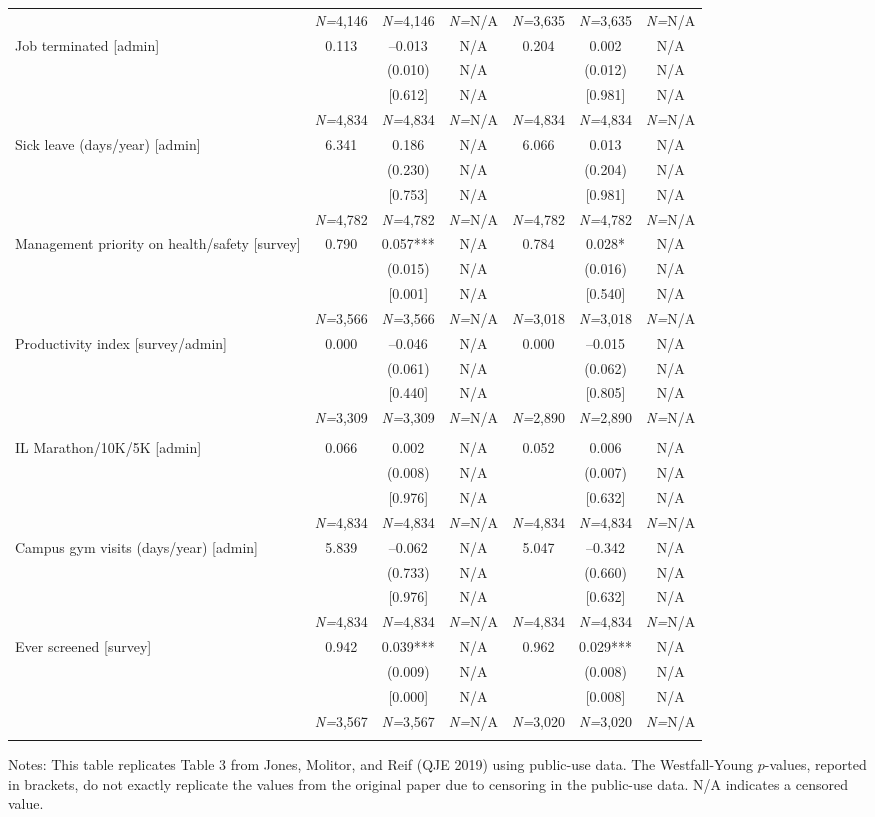 \documentclass{article}
\begin{document}
\begin{table}[tbp]
{\begin{tabularx}{\linewidth}{lCCCCCC}
&\textit{N=}4,146&\textit{N=}4,146&\textit{N=}N/A&\textit{N=}3,635&\textit{N=}3,635&\textit{N=}N/A \tabularnewline\addlinespace[0.75ex]
Job terminated [admin]&0.113&--0.013&N/A&0.204&0.002&N/A \tabularnewline
&&(0.010)&N/A&&(0.012)&N/A \tabularnewline
&&[0.612]&N/A&&[0.981]&N/A \tabularnewline
&\textit{N=}4,834&\textit{N=}4,834&\textit{N=}N/A&\textit{N=}4,834&\textit{N=}4,834&\textit{N=}N/A \tabularnewline\addlinespace[0.75ex]
Sick leave (days/year) [admin]&6.341&0.186&N/A&6.066&0.013&N/A \tabularnewline
&&(0.230)&N/A&&(0.204)&N/A \tabularnewline
&&[0.753]&N/A&&[0.981]&N/A \tabularnewline
&\textit{N=}4,782&\textit{N=}4,782&\textit{N=}N/A&\textit{N=}4,782&\textit{N=}4,782&\textit{N=}N/A \tabularnewline\addlinespace[0.75ex]
Management priority on health/safety [survey]&0.790&0.057***&N/A&0.784&0.028*&N/A \tabularnewline
&&(0.015)&N/A&&(0.016)&N/A \tabularnewline
&&[0.001]&N/A&&[0.540]&N/A \tabularnewline
&\textit{N=}3,566&\textit{N=}3,566&\textit{N=}N/A&\textit{N=}3,018&\textit{N=}3,018&\textit{N=}N/A \tabularnewline\addlinespace[0.75ex]
Productivity index [survey/admin]&0.000&--0.046&N/A&0.000&--0.015&N/A \tabularnewline
&&(0.061)&N/A&&(0.062)&N/A \tabularnewline
&&[0.440]&N/A&&[0.805]&N/A \tabularnewline
&\textit{N=}3,309&\textit{N=}3,309&\textit{N=}N/A&\textit{N=}2,890&\textit{N=}2,890&\textit{N=}N/A \tabularnewline\addlinespace[0.75ex]
&& \tabularnewline
\midrule IL Marathon/10K/5K [admin]&0.066&0.002&N/A&0.052&0.006&N/A \tabularnewline
&&(0.008)&N/A&&(0.007)&N/A \tabularnewline
&&[0.976]&N/A&&[0.632]&N/A \tabularnewline
&\textit{N=}4,834&\textit{N=}4,834&\textit{N=}N/A&\textit{N=}4,834&\textit{N=}4,834&\textit{N=}N/A \tabularnewline\addlinespace[0.75ex]
Campus gym visits (days/year) [admin]&5.839&--0.062&N/A&5.047&--0.342&N/A \tabularnewline
&&(0.733)&N/A&&(0.660)&N/A \tabularnewline
&&[0.976]&N/A&&[0.632]&N/A \tabularnewline
&\textit{N=}4,834&\textit{N=}4,834&\textit{N=}N/A&\textit{N=}4,834&\textit{N=}4,834&\textit{N=}N/A \tabularnewline\addlinespace[0.75ex]
Ever screened [survey]&0.942&0.039***&N/A&0.962&0.029***&N/A \tabularnewline
&&(0.009)&N/A&&(0.008)&N/A \tabularnewline
&&[0.000]&N/A&&[0.008]&N/A \tabularnewline
&\textit{N=}3,567&\textit{N=}3,567&\textit{N=}N/A&\textit{N=}3,020&\textit{N=}3,020&\textit{N=}N/A \tabularnewline
\bottomrule\addlinespace[-1.7ex] 

\end{tabularx}
\begin{flushleft}
\footnotesize Notes: This table replicates Table 3 from Jones, Molitor, and Reif (QJE 2019) using public-use data. The Westfall-Young \(p\)-values, reported in brackets, do not exactly replicate the values from the original paper due to censoring in the public-use data. N/A indicates a censored value.
\end{flushleft}
}
\end{table}
\end{document}
